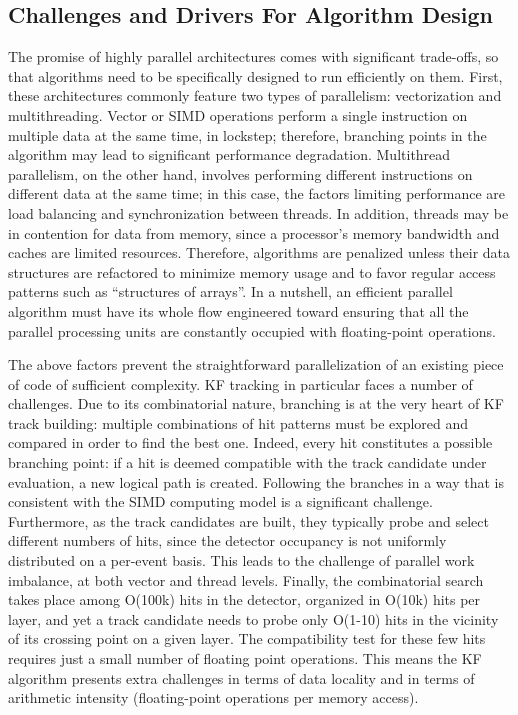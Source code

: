\documentclass[a4paper,11pt]{article}
\begin{document}
\subsection{Challenges and Drivers For Algorithm Design}

The promise of highly parallel architectures comes with significant trade-offs, so that algorithms need to be
specifically designed to run efficiently on them. First, these architectures commonly feature two types of parallelism: vectorization and multithreading. Vector or SIMD operations perform a single instruction on multiple data at the same time, in lockstep;
therefore, branching points in the algorithm may lead to significant performance degradation. 
Multithread parallelism, on the other hand, involves performing different instructions on different data at the same time; in this
case, the factors limiting performance are load balancing and synchronization between threads.
In addition, threads may be in contention for data from memory, since a processor's memory bandwidth and caches are limited resources. Therefore, algorithms are penalized unless their data structures are refactored to minimize memory usage and to favor regular access patterns such as ``structures of arrays''. 
In a nutshell, an efficient parallel algorithm must have its whole flow engineered toward ensuring that all the parallel processing units are constantly occupied with floating-point operations.

The above factors prevent the straightforward parallelization of an existing piece of code of sufficient complexity. KF tracking in particular faces a number of challenges.
Due to its combinatorial nature, branching is at the very heart of KF track building: multiple combinations of hit patterns must be explored and compared in order to find the best one. Indeed, every hit constitutes a possible branching point: if a hit is deemed compatible with the track candidate under evaluation, a new logical path is created.
Following the branches in a way that is consistent with the SIMD computing model is a significant challenge.
Furthermore, as the track candidates are built, they typically probe and select different numbers of hits, since the detector occupancy is not uniformly distributed on a per-event basis. This leads to the challenge of parallel work imbalance, at both vector and  thread levels. Finally, the combinatorial search takes place among O(100k) hits in the detector, organized in O(10k) hits per layer, and yet a track candidate needs to probe only O(1-10) hits in the vicinity of its crossing point on a given layer. The compatibility test for these few hits requires just a small number of floating point operations. This means the KF algorithm presents extra challenges in terms of data locality and in terms of arithmetic intensity (floating-point operations per memory access). 
\end{document}
